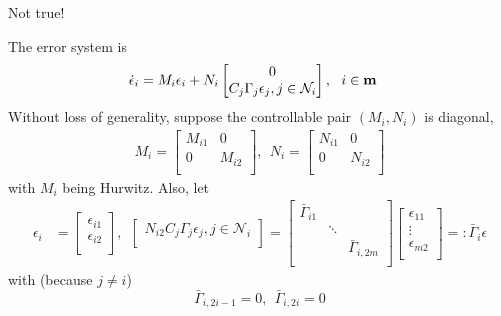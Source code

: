 \documentclass{beamer}
\begin{document}
\begin{frame}{\color{blue} Not true!}

The error system is
\begin{align*}
\dot{\epsilon}_{i}&=M_{i}\epsilon_{i} +N_{i}\begin{bmatrix} 0 \\ C_{j} \Gamma_{j}\epsilon_{j},j\in\mathcal{N}_{i} \\ \end{bmatrix},~~ i\in{\bf m}
\end{align*}
Without loss of generality, suppose the controllable pair $(M_{i},N_{i})$ is diagonal,
\begin{align*}
M_{i}=\begin{bmatrix} M_{i1} & 0 \\ 0 & M_{i2} \\ \end{bmatrix},~~ N_{i}=\begin{bmatrix} N_{i1} & 0 \\ 0 & N_{i2} \\ \end{bmatrix}
\end{align*}
with $M_{i}$ being Hurwitz. Also, let
\begin{align*}
\epsilon_{i}&=\begin{bmatrix} \epsilon_{i1} \\ \epsilon_{i2} \\ \end{bmatrix},~~
\begin{bmatrix} N_{i2}C_{j} \Gamma_{j}\epsilon_{j},j\in\mathcal{N}_{i} \\ \end{bmatrix}
=\begin{bmatrix} \bar{\Gamma}_{i1} &  &  \\ & \ddots &  \\  & & \bar{\Gamma}_{i,2m} \\ \end{bmatrix}\begin{bmatrix} \epsilon_{11} \\ \vdots \\ \epsilon_{m2} \\ \end{bmatrix}=:\bar{\Gamma}_{i}\epsilon
\end{align*}
with (because $j\neq i$)
\begin{equation*}
\bar{\Gamma}_{i,2i-1}=0,~~ \bar{\Gamma}_{i,2i}=0
\end{equation*}

\end{frame}
\end{document}
